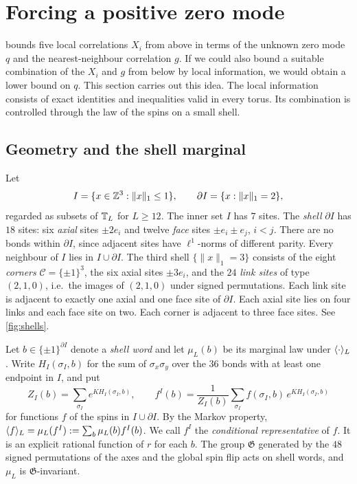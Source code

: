\section{Forcing a positive zero mode}\label{sec:ordered}

 bounds five local correlations $X_i$ from above in terms of the unknown zero mode $q$ and the nearest-neighbour correlation $g$. If we could also bound a suitable combination of the $X_i$ and $g$ from below by local information, we would obtain a lower bound on $q$. This section carries out this idea. The local information consists of exact identities and inequalities valid in every torus. Its combination is controlled through the law of the spins on a small shell.

\subsection{Geometry and the shell marginal}\label{sec:geometry}

Let
\[
 I=\{x\in\mathbb Z^3:\|x\|_1\le1\},\qquad \partial I=\{x:\|x\|_1=2\},
\]
regarded as subsets of $\mathbb T_L$ for $L\ge12$. The inner set $I$ has $7$ sites. The \emph{shell} $\partial I$ has $18$ sites: six \emph{axial} sites $\pm2e_i$ and twelve \emph{face} sites $\pm e_i\pm e_j$, $i<j$. There are no bonds within $\partial I$, since adjacent sites have $\ell^1$-norms of different parity. Every neighbour of $I$ lies in $I\cup\partial I$. The third shell $\{\|x\|_1=3\}$ consists of the eight \emph{corners} $\mathcal C=\{\pm1\}^3$, the six axial sites $\pm3e_i$, and the $24$ \emph{link sites} of type $(2,1,0)$, i.e.\ the images of $(2,1,0)$ under signed permutations. Each link site is adjacent to exactly one axial and one face site of $\partial I$. Each axial site lies on four links and each face site on two. Each corner is adjacent to three face sites. See \cref{fig:shells}.



Let $b\in\{\pm1\}^{\partial I}$ denote a \emph{shell word} and let $\mu_L(b)$ be its marginal law under $\langle \cdot\rangle_L$. Write $H_I(\sigma_I,b)$ for the sum of $\sigma_x\sigma_y$ over the $36$ bonds with at least one endpoint in $I$, and put
\[
 Z_I(b)=\sum_{\sigma_I}e^{KH_I(\sigma_I,b)},\qquad
 f^I(b)=\frac1{Z_I(b)}\sum_{\sigma_I}f(\sigma_I,b)\,e^{KH_I(\sigma_I,b)}
\]
for functions $f$ of the spins in $I\cup\partial I$. By the Markov property, $\langle f\rangle_L=\mu_L(f^I):=\sum_b\mu_L(b)f^I(b)$. We call $f^I$ the \emph{conditional representative} of $f$. It is an explicit rational function of $r$ for each $b$. The group $\mathfrak G$ generated by the $48$ signed permutations of the axes and the global spin flip acts on shell words, and $\mu_L$ is $\mathfrak G$-invariant.


